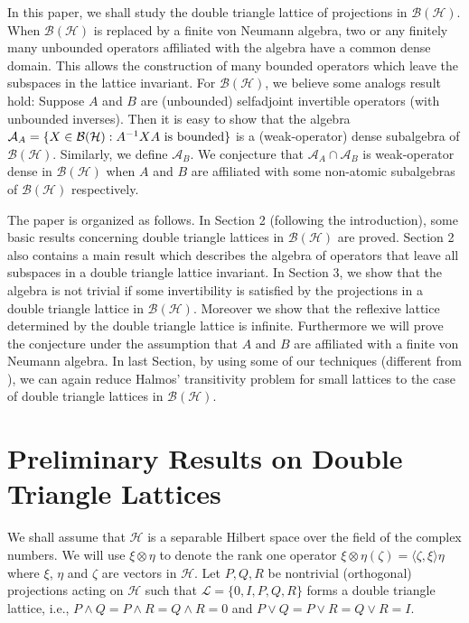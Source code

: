 \documentclass{jaums}
\theoremstyle{thmit} %
\theoremstyle{thmrm} %
\begin{document}
In this paper, we shall study the double triangle lattice of projections in
$\mathcal{B}(\mathcal{H})$. When $\mathcal{B}(\mathcal{H})$ is replaced by a
finite von Neumann algebra, two or any finitely many unbounded operators
affiliated with the algebra have a common dense domain. This allows the
construction of many bounded operators which leave the subspaces in the lattice
invariant. For $\mathcal{B}(\mathcal{H})$, we believe some analogs result hold:
Suppose $A$ and $B$ are (unbounded) selfadjoint invertible operators (with
unbounded inverses). Then it is easy to show that the algebra
$\mathcal{A}_A=\{X\in \mathcal{B}(\mathcal{H}): A^{-1}XA \ {\rm is\ bounded}\}$
is a (weak-operator) dense subalgebra of $\mathcal{B}(\mathcal{H})$. Similarly,
we define $\mathcal{A}_B$.
We conjecture that $\mathcal{A}_A\cap \mathcal{A}_B$ is weak-operator dense in
$\mathcal{B}(\mathcal{H})$ when $A$ and $B$ are affiliated with some non-atomic
subalgebras of $\mathcal{B}(\mathcal{H})$ respectively.

The paper is organized as follows. In Section 2 (following
the introduction), some basic results concerning double triangle lattices in
$\mathcal{B}(\mathcal{H})$ are proved.
Section 2 also contains a main result which describes the algebra of operators
that leave all subspaces in a double triangle lattice invariant. In Section 3,
we show that the algebra is not trivial if some invertibility is satisfied by
the projections in a double triangle lattice in $\mathcal{B}(\mathcal{H})$.
Moreover we show that the reflexive lattice determined by the double triangle
lattice is infinite. Furthermore we will prove the conjecture under the
assumption that $A$ and $B$ are affiliated with a finite von Neumann algebra. In
last Section, by using some of our techniques (different from {\cite{[Lo]}}), we
can again reduce Halmos' transitivity problem for small lattices to the case of
double triangle lattices in $\mathcal{B}(\mathcal{H})$.



\section{Preliminary Results on Double Triangle Lattices}

We shall assume that $\mathcal{H}$ is a separable Hilbert space over the field
of the complex numbers. We will use $\xi \otimes \eta$
to denote the rank one
operator $\xi \otimes \eta(\zeta) = \langle \zeta, \xi \rangle \eta$ where
$\xi$, $\eta$ and $\zeta$ are vectors in $\mathcal{H}$.
Let $P,Q,R$ be nontrivial (orthogonal) projections
acting on $\mathcal{H}$ such that
$\mathcal{L}=\{0,I,P,Q,R\}$ forms a double triangle lattice, i.e.,
$P\wedge Q=P\wedge R=Q\wedge R=0$ and $P\vee Q=P\vee R=Q\vee R=I$.
\end{document}
